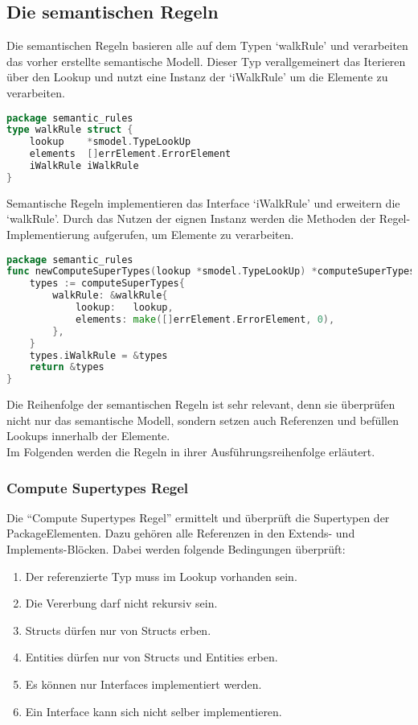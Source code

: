 \documentclass[./einleitung.tex]{subfiles}
\begin{document}
    \subsection{Die semantischen Regeln}\label{subsec:die-semantischen-regeln}
    Die semantischen Regeln basieren alle auf dem Typen `walkRule' und verarbeiten das vorher erstellte semantische Modell.
    Dieser Typ verallgemeinert das Iterieren über den Lookup und nutzt eine Instanz der `iWalkRule' um die Elemente zu verarbeiten.
    \begin{lstlisting}[language=go]
package semantic_rules
type walkRule struct {
	lookup    *smodel.TypeLookUp
	elements  []errElement.ErrorElement
	iWalkRule iWalkRule
}
    \end{lstlisting}
    Semantische Regeln implementieren das Interface `iWalkRule' und erweitern die `walkRule'.
    Durch das Nutzen der eignen Instanz werden die Methoden der Regel-Implementierung aufgerufen, um Elemente zu verarbeiten.
    \begin{lstlisting}[language=go]
package semantic_rules
func newComputeSuperTypes(lookup *smodel.TypeLookUp) *computeSuperTypes {
	types := computeSuperTypes{
		walkRule: &walkRule{
			lookup:   lookup,
			elements: make([]errElement.ErrorElement, 0),
		},
	}
    types.iWalkRule = &types
    return &types
}\end{lstlisting}

    Die Reihenfolge der semantischen Regeln ist sehr relevant, denn sie überprüfen nicht nur das semantische Modell, sondern setzen auch Referenzen und befüllen Lookups innerhalb der Elemente. \\
    Im Folgenden werden die Regeln in ihrer Ausführungsreihenfolge erläutert.

    \subsubsection{Compute Supertypes Regel}
    Die ``Compute Supertypes Regel'' ermittelt und überprüft die Supertypen der PackageElementen.
    Dazu gehören alle Referenzen in den Extends- und Implements-Blöcken.
    Dabei werden folgende Bedingungen überprüft:
    \begin{enumerate}
        \item Der referenzierte Typ muss im Lookup vorhanden sein.
        \item Die Vererbung darf nicht rekursiv sein.
        \item Structs dürfen nur von Structs erben.
        \item Entities dürfen nur von Structs und Entities erben.
        \item Es können nur Interfaces implementiert werden.
        \item Ein Interface kann sich nicht selber implementieren.
    \end{enumerate}
\end{document}
